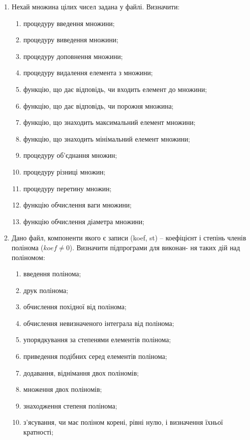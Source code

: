 \documentclass[]{article}
\makeatletter
\newcommand{\xslalph}[1]{\expandafter\@xslalph\csname c@#1\endcsname}
\newcommand{\@xslalph}[1]{%
    \ifcase#1\or а\or б\or в\or г\or д\or e\or є\or ж\or з\or i%
    \or й\or к\or л\or м\or н\or о\or п\or р\or с\or т%
    \or у\or ф\or х\or ц\or ч\or ш\or ю\or я\or аа\or бб\or вв %
    \else\@ctrerr\fi%
}
\makeatother
\begin{document}
\begin{enumerate}
\item  Нехай множина цілих чисел задана у файлі. Визначити: 
\begin{enumerate}[label=\xslalph*)]
\item процедуру введення множини; 
\item процедуру виведення множини; 
\item процедуру доповнення множини; 
\item процедуру видалення елемента з множини; 
\item функцію, що дає відповідь, чи входить елемент до множини; 
\item функцію, що дає відповідь, чи порожня множина; 
\item функцію, що знаходить максимальний елемент множини; 
\item функцію, що знаходить мінімальний елемент множини; 
\item процедуру об'єднання множин; 
\item процедуру різниці множин; 
\item процедуру перетину множин; 
\item функцію обчислення ваги множини; 
\item функцію обчислення діаметра множини;
 \end{enumerate}

\item  Дано файл,  компоненти  якого  є  записи (koef, st) –  коефіцієнт  і 
степінь членів полінома ($koef \neq 0$). Визначити підпрограми для виконан-
ня таких дій над поліномом:
\begin{enumerate}[label=\xslalph*)]
\item введення полінома; \item друк полінома; 
\item обчислення похідної від полінома; 
\item обчислення невизначеного інтеграла від полінома; 
\item упорядкування за степенями елементів полінома; 
\item приведення подібних серед елементів полінома; 
\item додавання, віднімання двох поліномів; 
\item множення двох поліномів; 
\item знаходження степеня полінома; 
\item з'ясування, чи має поліном корені, рівні нулю,  і визначення  їхньої кратності; 
\end{enumerate}
\end{enumerate}
\end{document}
